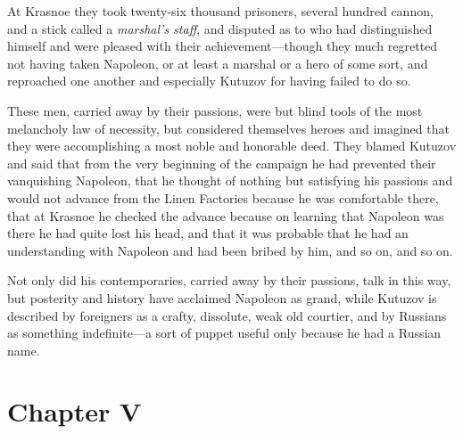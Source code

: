 At Krasnoe they took twenty-six thousand prisoners, several
hundred cannon, and a stick called a \emph{marshal's staff}, and
disputed as to who had distinguished himself and were pleased
with their achievement---though they much regretted not having
taken Napoleon, or at least a marshal or a hero of some sort, and
reproached one another and especially Kutuzov for having failed
to do so.

These men, carried away by their passions, were but blind tools
of the most melancholy law of necessity, but considered
themselves heroes and imagined that they were accomplishing a
most noble and honorable deed.  They blamed Kutuzov and said that
from the very beginning of the campaign he had prevented their
vanquishing Napoleon, that he thought of nothing but satisfying
his passions and would not advance from the Linen Factories
because he was comfortable there, that at Krasnoe he checked the
advance because on learning that Napoleon was there he had quite
lost his head, and that it was probable that he had an
understanding with Napoleon and had been bribed by him, and so
on, and so on.

Not only did his contemporaries, carried away by their passions,
talk in this way, but posterity and history have acclaimed
Napoleon as grand, while Kutuzov is described by foreigners as a
crafty, dissolute, weak old courtier, and by Russians as
something indefinite---a sort of puppet useful only because he
had a Russian name.


\chapter*{Chapter V}
\ifaudio 
{}
\fi

